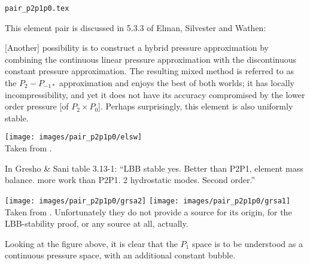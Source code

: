 \begin{flushright} {\tiny {\color{gray} \tt pair\_p2p1p0.tex}} \end{flushright}

This element pair is discussed in 5.3.3 of Elman, Silvester and Wathen: 
\begin{displayquote}
{\color{darkgray}
[Another] possibility is to construct a hybrid pressure approximation by 
combining the continuous linear pressure approximation with the 
discontinuous constant pressure approximation. The resulting mixed method 
is referred to as the $P_2-P_{-1*}$ 
approximation and enjoys the best of both worlds; it has locally 
incompressibility, and yet it does not have its accuracy compromised by
the lower order pressure [of $P_2\times P_0$]. 
Perhaps surprisingly, this element is also uniformly stable.
}
\end{displayquote}

\begin{center}
\texttt{[image: images/pair\_p2p1p0/elsw]}\\
{\captionfont Taken from \textcite{elsw}.}
\end{center}

In Gresho \& Sani table 3.13-1: 
``LBB stable yes. Better than P2P1, element mass balance.
more work than P2P1. 2 hydrostatic modes. Second order.'' 

\begin{center}
\texttt{[image: images/pair\_p2p1p0/grsa2]}
\texttt{[image: images/pair\_p2p1p0/grsa1]}\\
{\captionfont Taken from \textcite{grsa}. Unfortunately they do not 
provide a source for 
its origin, for the LBB-stability proof, or any source at all, actually.}
\end{center}

Looking at the figure above, it is clear that the $P_1$ space is to be understood 
as a continuous pressure space, with an additional constant bubble. 

